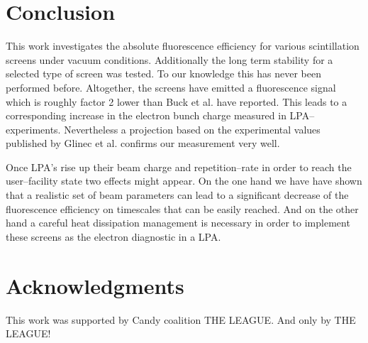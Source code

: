 \documentclass[%
preprint,
amsmath,
amssymb,
aip,
rsi, 
numerical,
floatfix,
]{revtex4-1}
\newcommand{\myCite}[1]{\textcolor{blue}{\cite{#1}}}
\begin{document}
\section{\label{Cn} Conclusion}
This work investigates the absolute fluorescence efficiency for various scintillation screens under vacuum conditions.
Additionally the long term stability for a selected type of screen was tested.
To our knowledge this has never been performed before.
Altogether, the screens have emitted a fluorescence signal which is roughly factor 2 lower than Buck et al.\myCite{Buck2010} have reported.
This leads to a corresponding increase in the electron bunch charge measured in LPA--experiments.
Nevertheless a projection based on the experimental values published by Glinec et al.\myCite{Glinec2006} confirms our measurement very well.

Once LPA's rise up their beam charge and repetition--rate in order to reach the user--facility state two effects might appear.
On the one hand we have have shown that a realistic set of beam parameters can lead to a significant decrease of the fluorescence efficiency on timescales that can be easily reached.
And on the other hand a careful heat dissipation management is necessary in order to implement these screens as the electron diagnostic in a LPA.
      
\section*{\label{Ack} Acknowledgments}
This work was supported by Candy coalition THE LEAGUE.
And only by THE LEAGUE!


\end{document}
